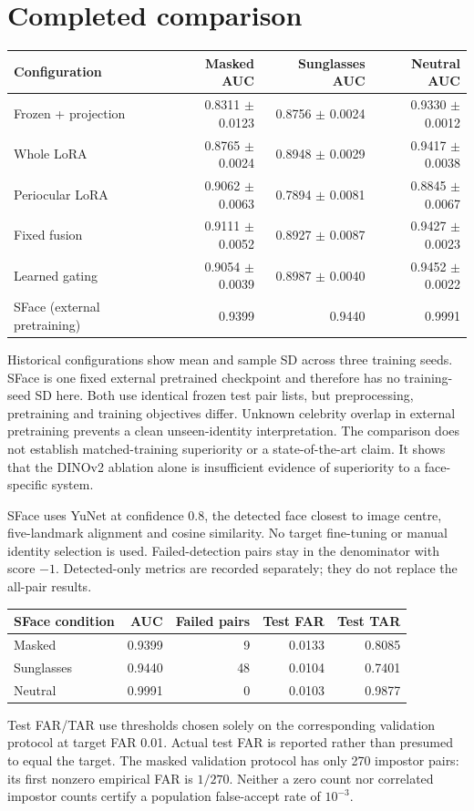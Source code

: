\documentclass[10pt,journal,onecolumn,compsoc]{IEEEtran}
\begin{document}
\section{Completed comparison}
\begin{center}
\begin{tabular}{lrrr}\toprule
Configuration & Masked AUC & Sunglasses AUC & Neutral AUC\\\midrule
Frozen + projection & 0.8311 $\pm$ 0.0123 & 0.8756 $\pm$ 0.0024 & 0.9330 $\pm$ 0.0012\\
Whole LoRA & 0.8765 $\pm$ 0.0024 & 0.8948 $\pm$ 0.0029 & 0.9417 $\pm$ 0.0038\\
Periocular LoRA & 0.9062 $\pm$ 0.0063 & 0.7894 $\pm$ 0.0081 & 0.8845 $\pm$ 0.0067\\
Fixed fusion & 0.9111 $\pm$ 0.0052 & 0.8927 $\pm$ 0.0087 & 0.9427 $\pm$ 0.0023\\
Learned gating & 0.9054 $\pm$ 0.0039 & 0.8987 $\pm$ 0.0040 & 0.9452 $\pm$ 0.0022\\
SFace (external pretraining) & 0.9399 & 0.9440 & 0.9991\\
\bottomrule\end{tabular}
\end{center}
Historical configurations show mean and sample SD across three training seeds. SFace is one fixed external pretrained checkpoint and therefore has no training-seed SD here. Both use identical frozen test pair lists, but preprocessing, pretraining and training objectives differ. Unknown celebrity overlap in external pretraining prevents a clean unseen-identity interpretation. The comparison does not establish matched-training superiority or a state-of-the-art claim. It shows that the DINOv2 ablation alone is insufficient evidence of superiority to a face-specific system.

SFace uses YuNet at confidence 0.8, the detected face closest to image centre, five-landmark alignment and cosine similarity. No target fine-tuning or manual identity selection is used. Failed-detection pairs stay in the denominator with score $-1$. Detected-only metrics are recorded separately; they do not replace the all-pair results.

\begin{center}
\begin{tabular}{lrrrr}\toprule
SFace condition & AUC & Failed pairs & Test FAR & Test TAR\\\midrule
Masked & 0.9399 & 9 & 0.0133 & 0.8085\\
Sunglasses & 0.9440 & 48 & 0.0104 & 0.7401\\
Neutral & 0.9991 & 0 & 0.0103 & 0.9877\\
\bottomrule\end{tabular}
\end{center}
Test FAR/TAR use thresholds chosen solely on the corresponding validation protocol at target FAR 0.01. Actual test FAR is reported rather than presumed to equal the target. The masked validation protocol has only 270 impostor pairs: its first nonzero empirical FAR is $1/270$. Neither a zero count nor correlated impostor counts certify a population false-accept rate of $10^{-3}$.
\end{document}
